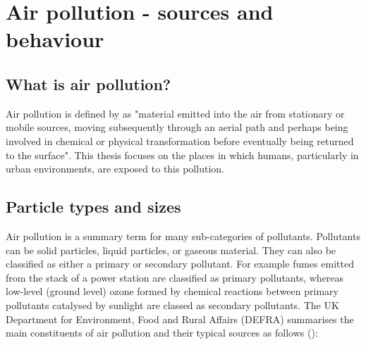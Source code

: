 \section{Air pollution - sources and behaviour}
\label{sec:whatisairpollution}

\subsection{What is air pollution?}
\label{subsec:whatisairpollution}
Air pollution is defined by \cite{colls1997} as "material emitted into the air from stationary or mobile sources, moving subsequently through an aerial path and perhaps being involved in chemical or physical transformation before eventually being returned to the surface". This thesis focuses on the places in which humans, particularly in urban environments, are exposed to this pollution.


\subsection{Particle types and sizes}
\label{subsec:particletypesandsizes}

Air pollution is a summary term for many sub-categories of pollutants. Pollutants can be solid particles, liquid particles, or gaseous material. They can also be classified as either a primary or secondary pollutant. For example fumes emitted from the stack of a power station are classified as primary pollutants, whereas low-level (ground level) ozone formed by chemical reactions between primary pollutants catalysed by sunlight are classed as secondary pollutants. The UK Department for Environment, Food and Rural Affairs (DEFRA) summarises the main constituents of air pollution and their typical sources as follows (\cite{DEFRA2011}):

